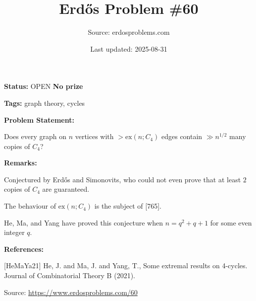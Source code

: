 \documentclass{article}
\title{Erd\H{o}s Problem \#60}
\date{Last updated: 2025-08-31}
\author{Source: erdosproblems.com}
\begin{document}
\maketitle

\noindent\textbf{Status:} OPEN \quad \textbf{No prize}

\noindent\textbf{Tags:} graph theory, cycles

\medskip
\noindent\textbf{Problem Statement:}

Does every graph on $n$ vertices with $>\mathrm{ex}(n;C_4)$ edges contain $\gg n^{1/2}$ many copies of $C_4$?

\bigskip
\noindent\textbf{Remarks:}

Conjectured by Erd\H{o}s and Simonovits, who could not even prove that at least $2$ copies of $C_4$ are guaranteed.

The behaviour of $\mathrm{ex}(n;C_4)$ is the subject of [765].

He, Ma, and Yang \cite{HeMaYa21} have proved this conjecture when $n=q^2+q+1$ for some even integer $q$.

\bigskip
\noindent\textbf{References:}

[HeMaYa21] He, J. and Ma, J. and Yang, T., Some extremal results on 4-cycles. Journal of Combinatorial Theory B (2021).

\bigskip
\noindent\small{Source: \url{https://www.erdosproblems.com/60}}
\end{document}
